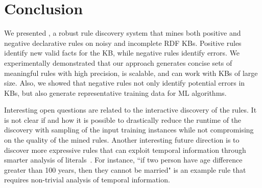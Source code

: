 \section{Conclusion}
We presented \krd, a robust rule discovery system that mines both positive and negative declarative rules on noisy and incomplete RDF KBs. Positive rules identify new valid facts for the KB, while negative rules identify errors. 
We experimentally demonstrated that our approach generates concise sets of meaningful rules with high precision,
is scalable, and can work with KBs of large size. 
Also, we showed that negative rules not only identify potential errors in KBs, but also generate representative training data for ML algorithms.

Interesting open questions are related to the interactive discovery of the rules. It is not clear if and how it is possible to drastically reduce the runtime of the discovery with sampling of the input training instances while not compromising on the quality of the mined rules. 
Another interesting future direction is to discover more expressive rules that can exploit temporal information through smarter analysis of literals~\cite{abedjan2015temporal}. For instance, ``if two person have age difference greater than 100 years, then they cannot be married" is an example rule that requires non-trivial analysis of temporal information. 


